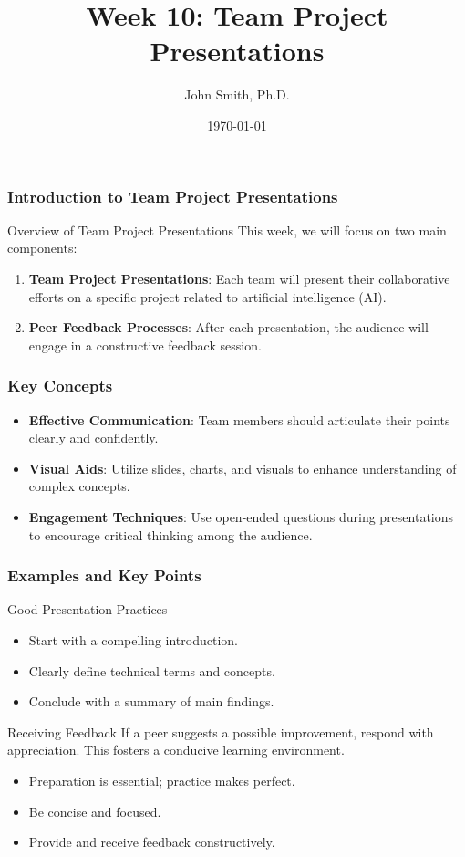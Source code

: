 \documentclass[aspectratio=169]{beamer}
\title[Week 10: Team Project Presentations]{Week 10: Team Project Presentations}
\author[J. Smith]{John Smith, Ph.D.}
\institute[University Name]{
  Department of Computer Science\\
  University Name\\
  \vspace{0.3cm}
  Email: email@university.edu\\
  Website: www.university.edu
}
\date{\today}
\begin{document}
\frame{\titlepage}

\begin{frame}[fragile]
    \frametitle{Introduction to Team Project Presentations}
    \begin{block}{Overview of Team Project Presentations}
        This week, we will focus on two main components:
        \begin{enumerate}
            \item \textbf{Team Project Presentations}: Each team will present their collaborative efforts on a specific project related to artificial intelligence (AI).
            \item \textbf{Peer Feedback Processes}: After each presentation, the audience will engage in a constructive feedback session.
        \end{enumerate}
    \end{block}
\end{frame}

\begin{frame}[fragile]
    \frametitle{Key Concepts}
    \begin{itemize}
        \item \textbf{Effective Communication}: Team members should articulate their points clearly and confidently.
        \item \textbf{Visual Aids}: Utilize slides, charts, and visuals to enhance understanding of complex concepts.
        \item \textbf{Engagement Techniques}: Use open-ended questions during presentations to encourage critical thinking among the audience.
    \end{itemize}
\end{frame}

\begin{frame}[fragile]
    \frametitle{Examples and Key Points}
    \begin{block}{Good Presentation Practices}
        \begin{itemize}
            \item Start with a compelling introduction.
            \item Clearly define technical terms and concepts.
            \item Conclude with a summary of main findings.
        \end{itemize}
    \end{block}
    
    \begin{block}{Receiving Feedback}
        If a peer suggests a possible improvement, respond with appreciation. This fosters a conducive learning environment.
    \end{block}
    
    \begin{itemize}
        \item Preparation is essential; practice makes perfect.
        \item Be concise and focused.
        \item Provide and receive feedback constructively.
    \end{itemize}
\end{frame}
\end{document}
